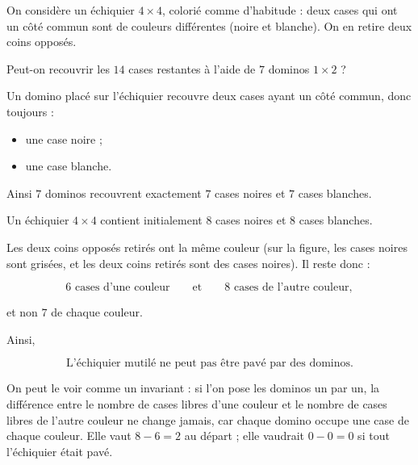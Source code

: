 \documentclass[11pt]{article}
\begin{document}
\begin{exemple}\label{exm:echiquier-mutile}
On considère un échiquier \(4\times4\), colorié comme d'habitude : deux
cases qui ont un côté commun sont de couleurs différentes (noire et blanche).
On en retire deux coins opposés.

Peut-on recouvrir les \(14\) cases restantes à l'aide de \(7\) dominos
\(1\times2\) ?

\begin{center}
\end{center}
\end{exemple}

\begin{solution}
Un domino placé sur l'échiquier recouvre deux cases ayant un côté commun,
donc toujours :

\begin{itemize}
    \item une case noire ;
    \item une case blanche.
\end{itemize}

Ainsi \(7\) dominos recouvrent exactement \(7\) cases noires et \(7\) cases
blanches.

Un échiquier \(4\times4\) contient initialement \(8\) cases noires et
\(8\) cases blanches.

Les deux coins opposés retirés ont la même couleur (sur la figure, les cases
noires sont grisées, et les deux coins retirés sont des cases noires). Il reste donc :

\[
6\text{ cases d'une couleur}
\qquad\text{et}\qquad
8\text{ cases de l'autre couleur},
\]

et non \(7\) de chaque couleur.

Ainsi,

\[
\boxed{
\text{L'échiquier mutilé ne peut pas être pavé par des dominos.}
}
\]

On peut le voir comme un invariant : si l'on pose les dominos un par un, la
différence entre le nombre de cases libres d'une couleur et le nombre de cases
libres de l'autre couleur ne change jamais, car chaque domino occupe une case
de chaque couleur. Elle vaut \(8-6=2\) au départ ; elle vaudrait \(0-0=0\) si
tout l'échiquier était pavé.
\end{solution}
\end{document}
